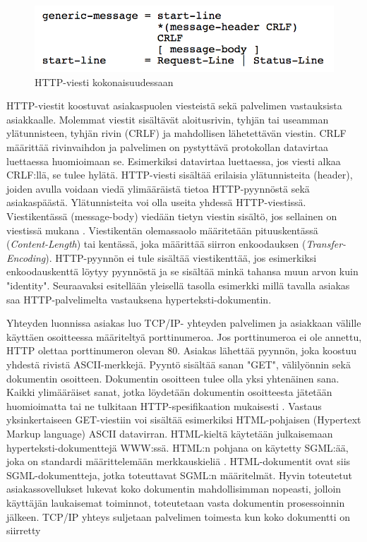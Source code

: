 \documentclass[utf8]{gradu3}
\begin{document}
\begin{figure}[h]
\centering
\includegraphics[scale=0.85]{generic_message.png}
\caption{HTTP-viesti kokonaisuudessaan \parencite{httprequest}}
\end{figure}

HTTP-viestit koostuvat asiakaspuolen viesteistä sekä palvelimen vastauksista asiakkaalle. Molemmat viestit sisältävät aloitusrivin, tyhjän tai useamman ylätunnisteen, tyhjän rivin (CRLF) ja mahdollisen lähetettävän viestin. CRLF määrittää rivinvaihdon ja palvelimen on pystyttävä protokollan datavirtaa luettaessa huomioimaan se. Esimerkiksi datavirtaa luettaessa, jos viesti alkaa CRLF:llä, se tulee hylätä. HTTP-viesti sisältää erilaisia ylätunnisteita (header), joiden avulla voidaan viedä ylimääräistä tietoa HTTP-pyynnöstä sekä asiakaspäästä. Ylätunnisteita voi olla useita yhdessä HTTP-viestissä. Viestikentässä (message-body) viedään tietyn viestin sisältö, jos sellainen on viestissä mukana \parencite{httprequest}. Viestikentän olemassaolo määritetään pituuskentässä (\emph{Content-Length}) tai kentässä, joka määrittää siirron enkoodauksen (\emph{Transfer-Encoding}). HTTP-pyynnön ei tule sisältää viestikenttää, jos esimerkiksi enkoodauskenttä löytyy pyynnöstä ja se sisältää minkä tahansa muun arvon kuin "identity".  Seuraavaksi esitellään yleisellä tasolla esimerkki millä tavalla asiakas saa HTTP-palvelimelta vastauksena hyperteksti-dokumentin.

Yhteyden luonnissa asiakas luo TCP/IP- yhteyden palvelimen ja asiakkaan välille käyttäen osoitteessa määriteltyä porttinumeroa. Jos porttinumeroa ei ole annettu, HTTP olettaa porttinumeron olevan 80. Asiakas lähettää pyynnön, joka koostuu yhdestä rivistä ASCII-merkkejä. Pyyntö sisältää sanan "GET", välilyönnin sekä dokumentin osoitteen. Dokumentin osoitteen tulee olla yksi yhtenäinen sana. Kaikki ylimääräiset sanat, jotka löydetään dokumentin osoitteesta jätetään huomioimatta tai ne tulkitaan HTTP-spesifikaation mukaisesti \parencite{w3http2}. Vastaus yksinkertaiseen GET-viestiin voi sisältää esimerkiksi HTML-pohjaisen (Hypertext Markup language) ASCII datavirran. HTML-kieltä käytetään julkaisemaan hyperteksti-dokumenttejä WWW:ssä. HTML:n pohjana on käytetty SGML:ää, joka on standardi määrittelemään merkkauskieliä \parencite{sgml}. HTML-dokumentit ovat siis SGML-dokumentteja, jotka toteuttavat SGML:n määritelmät.  Hyvin toteutetut asiakassovellukset lukevat koko dokumentin mahdollisimman nopeasti, jolloin käyttäjän laukaisemat toiminnot, toteutetaan vasta dokumentin prosessoinnin jälkeen. TCP/IP yhteys suljetaan palvelimen toimesta kun koko dokumentti on siirretty \parencite{w3http}
\end{document}
